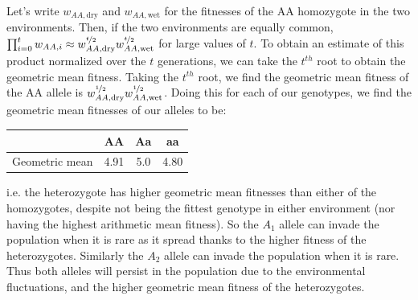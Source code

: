 {%
  
Let's write $w_{AA,\text{dry}}$ and $w_{AA,\text{wet}}$ for the fitnesses of the AA homozygote in the two environments. Then, if the
two environments are equally common, $\prod_{i=0}^{t}w_{AA,i} \approx w_{AA,\text{dry}}^{\nicefrac{t}{2}}
w_{AA,\text{wet}}^{\nicefrac{t}{2}}$ for large values of $t$. To
obtain an estimate of this product normalized over the $t$ generations,
we can take the $t^{th}$ root to obtain the geometric mean fitness. Taking the $t^{th}$ root, we find the geometric mean fitness of the AA allele  is $w_{AA,\text{dry}}^{\nicefrac{1}{2}}
w_{AA,\text{wet}}^{\nicefrac{1}{2}}$. Doing this for each of our
genotypes, we find the geometric mean fitnesses of our alleles to be:
\begin{center}
\begin{tabular}{cccc} 
& AA & Aa & aa \\
\hline 
Geometric mean & 4.91 & 5.0 & 4.80\\
\end{tabular}
\end{center}
i.e. the heterozygote has higher geometric mean fitnesses than either of
the homozygotes, despite not being the fittest genotype in either
environment (nor having the highest arithmetic mean fitness). So the $A_1$ allele can invade the population when it is rare as it spread thanks to the higher fitness of the heterozygotes. Similarly the $A_2$
allele can invade the population when it is rare. Thus both alleles
will persist in the population due to the environmental fluctuations,
and the higher geometric mean fitness of the heterozygotes. 





}
